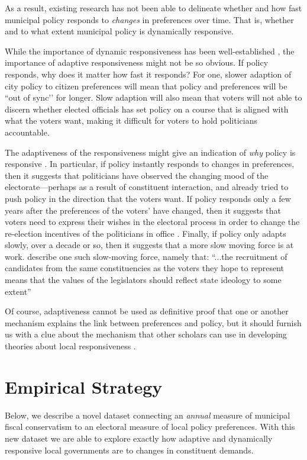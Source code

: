 \documentclass[a4paper,12pt]{article}
\begin{document}
As a result, existing research has not been able to delineate whether and how fast municipal policy responds to \textit{changes} in preferences over time. That is, whether and to what extent municipal policy is dynamically responsive. 

While the importance of dynamic responsiveness has been well-established \citep{stimson1995dynamic}, the importance of adaptive responsiveness might not be so obvious. If policy responds, why does it matter how fast it responds? For one, slower adaption of city policy to citizen preferences will mean that policy and preferences will be ``out of sync’’ for longer. Slow adaption will also mean that voters will not able to discern whether elected officials has set policy on a course that is aligned with what the voters want, making it difficult for voters to hold politicians accountable.

The adaptiveness of the responsiveness might give an indication of \textit{why} policy is responsive \citep{tausanovitch2019subnational}. In particular, if policy instantly responds to changes in preferences, then it suggests that politicians have observed the changing mood of the electorate---perhaps as a result of constituent interaction, and already tried to push policy in the direction that the voters want. If policy responds only a few years after the preferences of the voters' have changed, then it suggests that voters need to express their wishes in the electoral process in order to change the re-election incentives  of the politicians in office \citep[e.g.,]{boyne2009democracy}. Finally, if policy only adapts slowly, over a decade or so, then it suggests that a more slow moving force is at work. \cite[][90]{erikson1993statehouse} describe one such slow-moving force, namely that: ``...the recruitment of candidates from the same constituencies as  the voters they hope to represent means that the values of the legislators should reflect state ideology to some extent''

Of course, adaptiveness cannot be used as definitive proof that one or another mechanism explains the link between preferences and policy, but it should furnish us with a clue about the mechanism that other scholars can use in developing theories about local responsiveness \citep{tausanovitch2019subnational}.

\section*{Empirical Strategy}
Below, we describe a novel dataset connecting an \textit{annual} measure of municipal fiscal conservatism to an electoral measure of local policy preferences. With this new dataset we are able to explore exactly how adaptive and dynamically responsive local governments are to changes in constituent demands.
\end{document}
